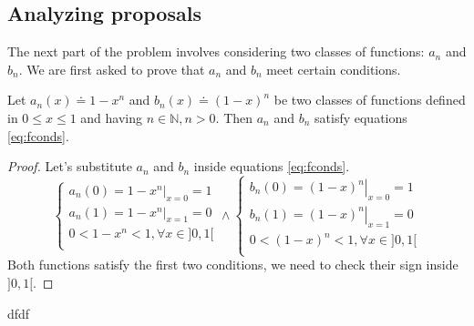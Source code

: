 \subsection{Analyzing proposals}
\label{sec:c1p2}
The next part of the problem involves considering two classes of functions:
$a_n$ and $b_n$. We are first asked to prove that $a_n$ and $b_n$
meet certain conditions.
\begin{proposition}
Let $a_n(x) \doteq 1-x^n$ and $b_n(x) \doteq (1-x)^n$ be two classes of functions 
defined in $0 \leq x \leq 1$ and having $n \in \mathbb{N}, n > 0$. Then
$a_n$ and $b_n$ satisfy equations \ref{eq:fconds}.
\begin{proof}
Let's substitute $a_n$ and $b_n$ inside equations \ref{eq:fconds}.
\begin{equation*}
\begin{cases}
a_n(0) = \left. 1-x^n \right|_{x=0} = 1\\
a_n(1) = \left. 1-x^n \right|_{x=1} = 0\\
0 < 1-x^n < 1, \forall x \in ]0,1[\\
\end{cases}
\wedge
\begin{cases}
b_n(0) = \left. (1-x)^n \right|_{x=0} = 1\\
b_n(1) = \left. (1-x)^n \right|_{x=1} = 0\\
0 < (1-x)^n < 1, \forall x \in ]0,1[\\
\end{cases}
\end{equation*}
Both functions satisfy the first two conditions, we need to check their sign inside $]0,1[$.
\end{proof}
\end{proposition}
dfdf
